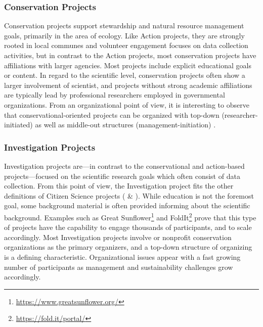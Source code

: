 \subsubsection{Conservation Projects}
Conservation projects support stewardship and natural resource management goals, primarily in the area of ecology. Like Action projects, they are strongly rooted in local communes and volunteer engagement focuses on data collection activities, but in contrast to the Action projects, most conservation projects have affiliations with larger agencies.  Most projects include explicit educational goals or content. In regard to the scientific level, conservation projects often show a larger involvement of scientist, and projects without strong academic affiliations are typically lead by professional researchers employed in governmental organizations. From an organizational point of view, it is interesting to observe that conservational-oriented projects can be organized with top-down (researcher-initiated) as well as middle-out structures  (management-initiation)  \parencite[xx]{WigginsCrowston2011}.

\subsubsection{Investigation Projects}
Investigation projects are---in contrast to the conservational and action-based projects---focused on the scientific research goals which often consist of data collection. From this point of view, the Investigation project fits the other definitions of Citizen Science projects (\cite{Hakalay2014} \& \cite{Arnstein1969}). While education is not the foremost goal, some background material is often provided informing about the scientific background. Examples such as Great Sunflower\footnote{\url{https://www.greatsunflower.org/}} and FoldIt\footnote{\url{https://fold.it/portal/}} prove that this type of projects have the capability to engage thousands of participants, and to scale accordingly. Most Investigation projects involve or nonprofit conservation organizations as the primary organizers, and a top-down structure of organizing is a defining characteristic. Organizational issues appear with a fast growing number of participants as management and sustainability challenges grow accordingly. \parencite{WigginsCrowston2011}

